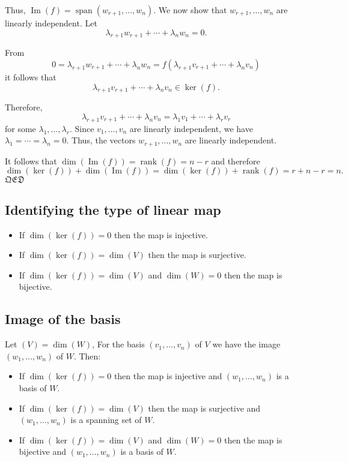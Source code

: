     Thus, \(\operatorname{Im}(f) = \operatorname{span}(w_{r+1}, \ldots, w_n)\). We now show that \(w_{r+1}, \ldots, w_n\) are linearly independent. Let 
    \[\lambda_{r+1}w_{r+1} + \cdots + \lambda_n w_n = 0.\]
    
    From
    \[0 = \lambda_{r+1}w_{r+1} + \cdots + \lambda_n w_n = f(\lambda_{r+1}v_{r+1} + \cdots + \lambda_n v_n)\]
    it follows that
    \[\lambda_{r+1}v_{r+1} + \cdots + \lambda_n v_n \in \ker(f).\]
    
    Therefore,
    \[\lambda_{r+1}v_{r+1} + \cdots + \lambda_n v_n = \lambda_1v_1 + \cdots + \lambda_r v_r\]
    for some \(\lambda_1, \ldots, \lambda_r\). Since \(v_1, \ldots, v_n\) are linearly independent, we have \(\lambda_1 = \cdots = \lambda_n = 0\). Thus, the vectors \(w_{r+1}, \ldots, w_n\) are linearly independent.
    
    It follows that \(\dim(\operatorname{Im}(f)) = \operatorname{rank}(f) = n - r\) and therefore
    \[\dim(\ker(f)) + \dim(\operatorname{Im}(f)) = \dim(\ker(f)) + \operatorname{rank}(f) = r + n - r = n.\]
  \(\mathfrak{QED}\)
  
\subsection{Identifying the type of linear map}

\begin{itemize}[label=\(-\)]
    
\item If \(\dim(\ker(f)) = 0\) then the map is injective.

\item If \(\dim(\ker(f)) = \dim(V)\) then the map is surjective.

\item If \(\dim(\ker(f)) = \dim(V)\) and \(\dim(W) = 0\) then the map is bijective.
\end{itemize}

\subsection{Image of the basis}

Let \((V) = \dim(W)\), For the basis \((v_1, \dots, v_n)\) of \(V\) we have the image \((w_1, \dots, w_n)\) of \(W\). Then:
\begin{itemize}[label=\(-\)]
    \item If \(\dim(\ker(f)) = 0\) then the map is injective and \((w_1, \dots, w_n)\) is a basis of \(W\).
    
    \item If \(\dim(\ker(f)) = \dim(V)\) then the map is surjective and \((w_1, \dots, w_n)\) is a spanning set of \(W\).
    
    \item If \(\dim(\ker(f)) = \dim(V)\) and \(\dim(W) = 0\) then the map is bijective and \((w_1, \dots, w_n)\) is a basis of \(W\).
\end{itemize}
